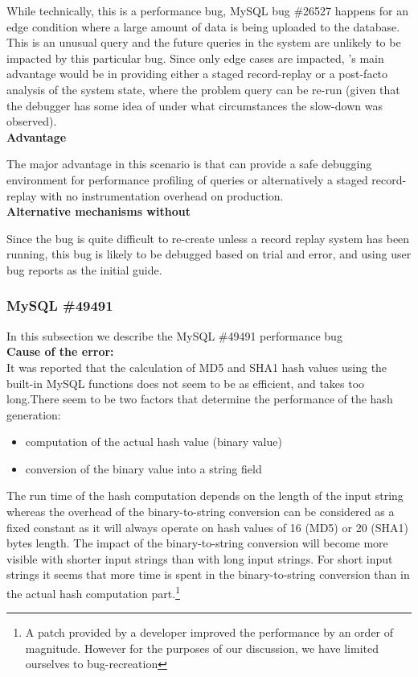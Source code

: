 While technically, this is a performance bug, MySQL bug \#26527 happens for an edge condition where a large amount of data is being uploaded to the database. This is an unusual query and the future queries in the system are unlikely to be impacted by this particular bug. Since only edge cases are impacted, \parikshan's main advantage would be in providing either a staged record-replay or a post-facto analysis of the system state, where the problem query can be re-run (given that the debugger has some idea of under what circumstances the slow-down was observed).\\  

\noindent \textbf{Advantage}

The major advantage in this scenario is that \parikshan can provide a safe debugging environment for performance profiling of queries or alternatively a staged record-replay with no instrumentation overhead on production.\\

\noindent \textbf{Alternative mechanisms without \parikshan}

Since the bug is quite difficult to re-create unless a record replay system has been running, this bug is likely to be debugged based on trial and error, and using user bug reports as the initial guide.

\subsubsection{MySQL \#49491}

In this subsection we describe the MySQL \#49491 performance bug \\

\noindent \textbf{Cause of the error:} \\

It was reported that the calculation of MD5 and SHA1 hash values using the built-in MySQL functions does not seem to be as efficient, and takes too long.There seem to be two factors that determine the performance of the hash generation:
\begin{itemize}
	\item computation of the actual hash value (binary value)
	\item conversion of the binary value into a string field
\end{itemize}

The run time of the hash computation depends on the length of the input string whereas the overhead of the binary-to-string conversion can be considered as a fixed constant as it will always operate on hash values of 16 (MD5) or 20 (SHA1) bytes length.
The impact of the binary-to-string conversion will become more visible with shorter input strings than with long input strings. For short input strings it seems that more time is spent in the binary-to-string conversion than in the actual hash computation part.\footnote{A patch provided by a developer improved the performance by an order of magnitude. However for the purposes of our discussion, we have limited ourselves to bug-recreation}\\

